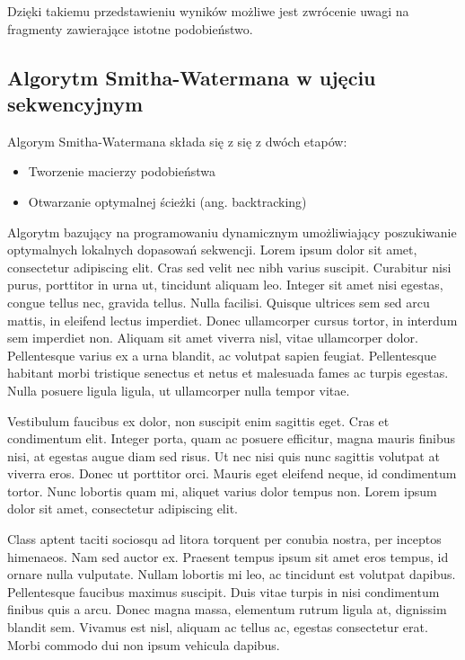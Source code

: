 \documentclass[a4paper,12pt]{article}
\newenvironment{lista}{
\begin{itemize}
  \setlength{\itemsep}{1pt}
  \setlength{\parskip}{0pt}
  \setlength{\parsep}{0pt}
}{\end{itemize}}
\begin{document}
Dzięki takiemu przedstawieniu wyników możliwe jest zwrócenie uwagi na fragmenty zawierające istotne podobieństwo. 


\subsection*{Algorytm Smitha-Watermana w ujęciu sekwencyjnym}

Algorym Smitha-Watermana składa się z się z dwóch etapów:
\begin{lista}
 \item Tworzenie macierzy podobieństwa
\item Otwarzanie optymalnej ścieżki (ang. backtracking)
\end{lista}


Algorytm bazujący na programowaniu dynamicznym umożliwiający poszukiwanie optymalnych lokalnych dopasowań sekwencji.
Lorem ipsum dolor sit amet, consectetur adipiscing elit. Cras sed velit nec nibh varius suscipit. Curabitur nisi purus, porttitor in urna ut, tincidunt aliquam leo. Integer sit amet nisi egestas, congue tellus nec, gravida tellus. Nulla facilisi. Quisque ultrices sem sed arcu mattis, in eleifend lectus imperdiet. Donec ullamcorper cursus tortor, in interdum sem imperdiet non. Aliquam sit amet viverra nisl, vitae ullamcorper dolor. Pellentesque varius ex a urna blandit, ac volutpat sapien feugiat. Pellentesque habitant morbi tristique senectus et netus et malesuada fames ac turpis egestas. Nulla posuere ligula ligula, ut ullamcorper nulla tempor vitae.

Vestibulum faucibus ex dolor, non suscipit enim sagittis eget. Cras et condimentum elit. Integer porta, quam ac posuere efficitur, magna mauris finibus nisi, at egestas augue diam sed risus. Ut nec nisi quis nunc sagittis volutpat at viverra eros. Donec ut porttitor orci. Mauris eget eleifend neque, id condimentum tortor. Nunc lobortis quam mi, aliquet varius dolor tempus non. Lorem ipsum dolor sit amet, consectetur adipiscing elit.

Class aptent taciti sociosqu ad litora torquent per conubia nostra, per inceptos himenaeos. Nam sed auctor ex. Praesent tempus ipsum sit amet eros tempus, id ornare nulla vulputate. Nullam lobortis mi leo, ac tincidunt est volutpat dapibus. Pellentesque faucibus maximus suscipit. Duis vitae turpis in nisi condimentum finibus quis a arcu. Donec magna massa, elementum rutrum ligula at, dignissim blandit sem. Vivamus est nisl, aliquam ac tellus ac, egestas consectetur erat. Morbi commodo dui non ipsum vehicula dapibus.
\end{document}
